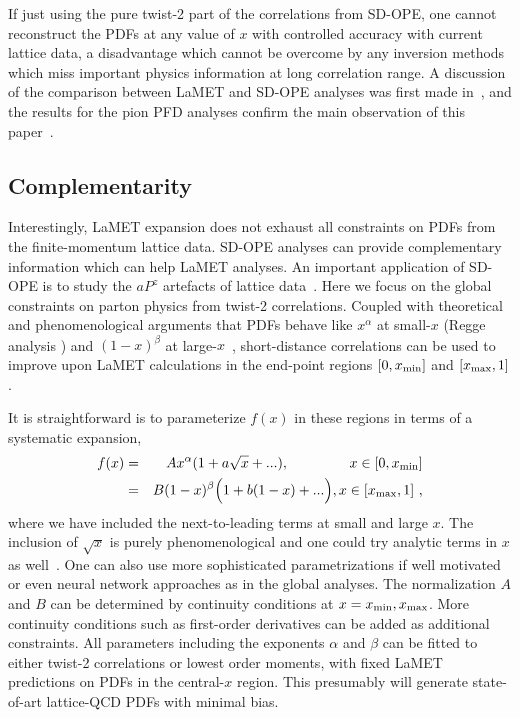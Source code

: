 \documentclass[prd,aps,twocolumn,preprintnumbers,showpacs,nofootinbib,superscriptaddress,notitlepage]{revtex4-2}
\begin{document}
If just using the pure twist-2 part of the correlations from SD-OPE, one cannot reconstruct the PDFs at any value of $x$ with controlled accuracy with current lattice data, a disadvantage which cannot be overcome by any inversion methods which miss important physics information at long 
correlation range. A discussion of the comparison between LaMET and SD-OPE analyses was first made in~\cite{Ji:2020byp}, and the results for the pion PFD analyses confirm the main observation of this paper~\cite{Gao:2020ito,Gao:2021dbh}. 

\subsection{Complementarity}

Interestingly, LaMET expansion does not exhaust all constraints on PDFs from the finite-momentum lattice data. SD-OPE analyses can provide complementary information which can help LaMET analyses. An important application of SD-OPE is to study the $aP^z$ artefacts of lattice data~\cite{Joo:2020spy, Gao:2020ito}. Here we
focus on the global constraints on parton
physics from twist-2 correlations. 
Coupled with theoretical and phenomenological arguments that PDFs behave like $x^\alpha$ at small-$x$ (Regge analysis \cite{Ioffe:1985ep}) and $(1-x)^\beta$ at large-$x$~\cite{Drell:1969km, West:1970av}, short-distance correlations can be
used to improve upon LaMET calculations in the end-point regions $[0, x_{\rm min}]$ and $[x_{\rm max},1]$. 

It is straightforward is to parameterize $f(x)$ in these regions in terms of a systematic expansion,
\begin{eqnarray}
     f(x) & =&  Ax^\alpha (1+a\sqrt{x}+...),  ~~~~~~~~~~~~~x\in [0, x_{\rm min}]  \\
        &=& B (1-x)^\beta \Big(1+b(1-x)+...\Big), x \in [x_{\rm max}, 1] \nonumber \ ,  
\end{eqnarray}
where we have included the next-to-leading terms at small and large $x$. The inclusion
of $\sqrt{x}$ is purely phenomenological and one could try analytic terms in $x$ as well~\cite{Dulat:2015mca}. 
One can also use more sophisticated parametrizations if well motivated or even neural network approaches as in the global analyses. The normalization $A$ and $B$ can be determined by continuity conditions at $x=x_{\rm min}, x_{\rm max}$. More continuity conditions such as first-order derivatives can be added as
additional constraints. All parameters including the exponents $\alpha$ and $\beta$ can be fitted to either twist-2 
correlations or lowest order moments, with fixed LaMET predictions on PDFs in the central-$x$ region. This presumably will generate state-of-art lattice-QCD 
PDFs with minimal bias. 
\end{document}
